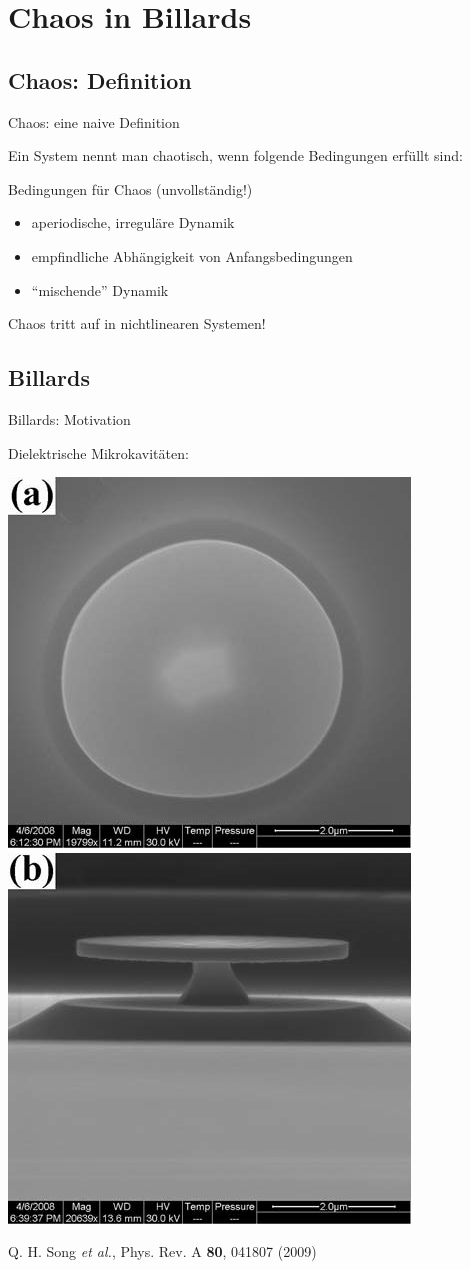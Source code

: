 \section{Chaos in Billards}
\subsection{Chaos: Definition}

\begin{frame}{Chaos: eine naive Definition}

  Ein System nennt man chaotisch, wenn folgende Bedingungen erfüllt sind:

  \begin{alertbbox}{Bedingungen für Chaos (unvollständig!)}
    \begin{itemize}
    \item aperiodische, irreguläre Dynamik
    \item empfindliche Abhängigkeit von Anfangsbedingungen
    \item ``mischende'' Dynamik
    \end{itemize}

  \end{alertbbox}

  Chaos tritt auf in \alert{nichtlinearen} Systemen!
\end{frame}


\subsection{Billards}
\begin{frame}{Billards: Motivation}

  Dielektrische Mikrokavitäten:

  \begin{center}
    \includegraphics[width=0.40\linewidth]{Figures/Cao1.png}
    \includegraphics[width=0.40\linewidth]{Figures/Cao2.png}
  \end{center}

  {\footnotesize{Q. H. Song \emph{et al.}, Phys. Rev. A {\bf 80}, 041807 (2009)}}

\end{frame}


